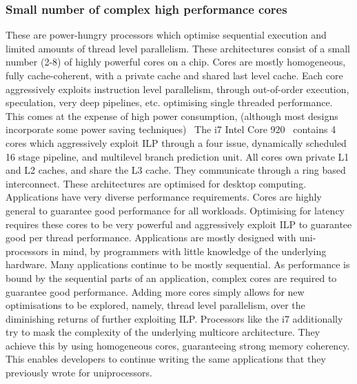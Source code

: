 \subsubsection{Small number of complex high performance cores}
These are power-hungry processors which optimise sequential execution
and limited amounts of thread level parallelism. These architectures 
consist of a small number (2-8) of highly powerful cores on a 
chip. Cores are mostly homogeneous, fully cache-coherent, with a private cache 
and shared last level cache. 
Each core aggressively exploits instruction level parallelism, through
out-of-order execution, speculation, very deep pipelines, etc. optimising
single threaded performance. This comes at the expense of high power consumption, 
(although most designs incorporate some power
saving techniques)~\cite{Vajda:1414193,Borkar:2007:TCC:1278480.1278667}
The i7 Intel Core 920~\cite{rotem2012pai} contains 4 cores which aggressively exploit ILP through a four issue, dynamically scheduled 16 stage pipeline, and multilevel branch prediction unit. All cores own
 private L1 and L2 caches, and share the L3 cache. They communicate
through a ring based interconnect. These architectures are
optimised for desktop computing. Applications have very diverse performance requirements. Cores are highly general to guarantee good performance for all workloads. Optimising for latency requires these cores to be very powerful  and aggressively exploit ILP to guarantee good per thread performance. Applications are mostly designed with uni-processors in mind, by programmers with little knowledge of the underlying hardware. Many applications continue to be mostly sequential. As performance is bound by the sequential parts of an application, 
complex cores are required to guarantee good performance.
Adding more cores simply allows for new optimisations to be explored, namely, 
thread level parallelism, over the diminishing returns of further exploiting ILP.
Processors like the i7 additionally try to mask the complexity of the underlying 
multicore architecture. They achieve this by using homogeneous cores, guaranteeing
strong memory coherency. This enables developers to continue writing
the same applications that they previously wrote for uniprocessors.


